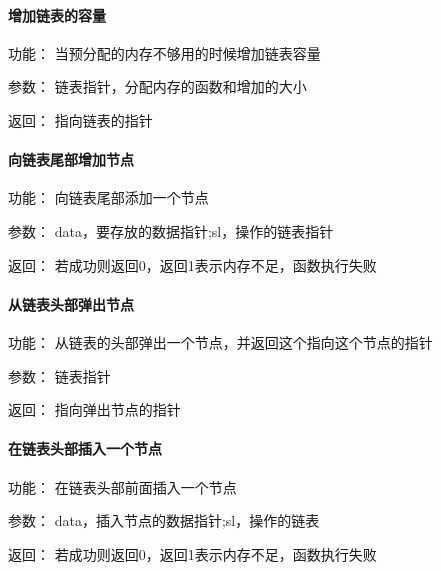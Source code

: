 \paragraph{增加链表的容量}
	\begin{compactdesc}
	\item[功能：]当预分配的内存不够用的时候增加链表容量
	\item[参数：]链表指针，分配内存的函数和增加的大小
	\item[返回：]指向链表的指针
	\end{compactdesc}
\paragraph{向链表尾部增加节点}
	\begin{compactdesc}
	\item[功能：]向链表尾部添加一个节点
	\item[参数：]data，要存放的数据指针;sl，操作的链表指针
	\item[返回：]若成功则返回0，返回1表示内存不足，函数执行失败
	\end{compactdesc}
\paragraph{从链表头部弹出节点}
	\begin{compactdesc}
	\item[功能：]从链表的头部弹出一个节点，并返回这个指向这个节点的指针
	\item[参数：]链表指针
	\item[返回：]指向弹出节点的指针
	\end{compactdesc}
\paragraph{在链表头部插入一个节点}
	\begin{compactdesc}
	\item[功能：]在链表头部前面插入一个节点
	\item[参数：]data，插入节点的数据指针;sl，操作的链表
	\item[返回：]若成功则返回0，返回1表示内存不足，函数执行失败
	\end{compactdesc}
